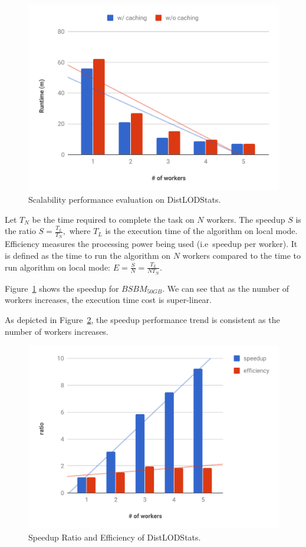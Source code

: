 \begin{figure}
\includegraphics[width=1.0\columnwidth]{images/4_distlodstats/distlodstats-node-scalability.pdf}
\caption{Scalability performance evaluation on DistLODStats.}
\label{fig:Scalability}
\end{figure}

Let $T_N$ be the time required to complete the task on $N$ workers. The speedup $S$ is the ratio
$ S = \frac{T_L}{T_N},$
where $T_L$ is the execution time of the algorithm on local mode.
Efficiency measures the processing power being used (i.e~speedup per worker). 
It is defined as the time to run the algorithm on $N$ workers compared to the time to run algorithm on local mode:
$ E = \frac{S}{N} =\frac{T_{L}}{N T_{N}}.$

Figure~\ref{fig:Scalability} shows the speedup for $BSBM_{50GB}$.
We can see that as the number of workers increases, the execution time cost is super-linear.

As depicted in Figure~\ref{fig:Effectiveness}, the speedup performance trend is consistent as the number of workers increases.

\begin{figure}
\includegraphics[width=1.0\columnwidth]{images/4_distlodstats/distlodstats-effectiveness.pdf}
\caption{Speedup Ratio and Efficiency of DistLODStats.}
\label{fig:Effectiveness}
\end{figure}

